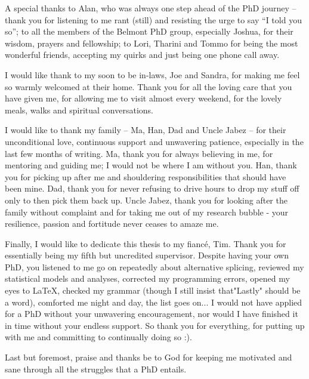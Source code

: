 A special thanks to Alan, who was always one step ahead of the PhD journey – thank you for listening to me rant (still) and resisting the urge to say “I told you so”; to all the members of the Belmont PhD group, especially Joshua, for their wisdom, prayers and fellowship; to Lori, Tharini and Tommo for being the most wonderful friends, accepting my quirks and just being one phone call away. 

I would like thank to my soon to be in-laws, Joe and Sandra, for making me feel so warmly welcomed at their home. Thank you for all the loving care that you have given me, for allowing me to visit almost every weekend, for the lovely meals, walks and spiritual conversations.
 
I would like to thank my family – Ma, Han, Dad and Uncle Jabez – for their unconditional love, continuous support and unwavering patience, especially in the last few months of writing. Ma, thank you for always believing in me, for mentoring and guiding me; I would not be where I am without you. Han, thank you for picking up after me and shouldering responsibilities that should have been mine. Dad, thank you for never refusing to drive hours to drop my stuff off only to then pick them back up. Uncle Jabez, thank you for looking after the family without complaint and for taking me out of my research bubble - your resilience, passion and fortitude never ceases to amaze me.  

Finally, I would like to dedicate this thesis to my fiancé, Tim. Thank you for essentially being my fifth but uncredited supervisor. Despite having your own PhD, you listened to me go on repeatedly about alternative splicing, reviewed my statistical models and analyses, corrected my programming errors, opened my eyes to LaTeX, checked my grammar (though I still insist that"Lastly" should be a word), comforted me night and day, the list goes on... I would not have applied for a PhD without your unwavering encouragement, nor would I have finished it in time without your endless support. So thank you for everything, for putting up with me and committing to continually doing so :).

Last but foremost, praise and thanks be to God for keeping me motivated and sane through all the struggles that a PhD entails.

\endgroup